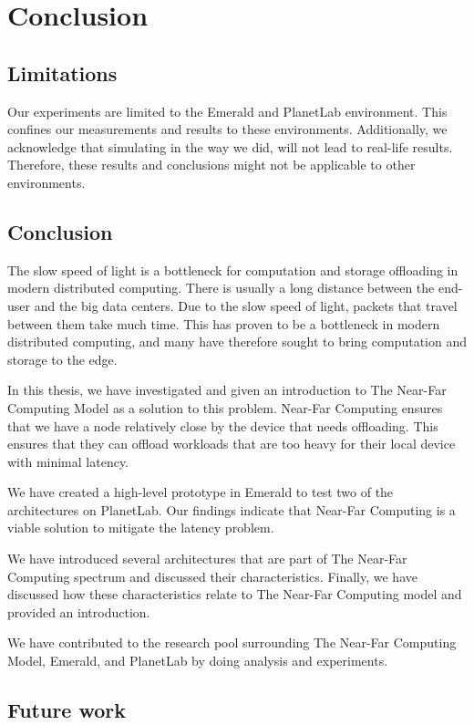 \chapter{Conclusion}

\section{Limitations}
Our experiments are limited to the Emerald and PlanetLab environment. This confines our measurements and results to these environments. Additionally, we acknowledge that simulating in the way we did, will not lead to real-life results. Therefore, these results and conclusions might not be applicable to other environments.


\section{Conclusion}
The slow speed of light is a bottleneck for computation and storage offloading in modern distributed computing. There is usually a long distance between the end-user and the big data centers. Due to the slow speed of light, packets that travel between them take much time. This has proven to be a bottleneck in modern distributed computing, and many have therefore sought to bring computation and storage to the edge. 

In this thesis, we have investigated and given an introduction to The Near-Far Computing Model as a solution to this problem. Near-Far Computing ensures that we have a node relatively close by the device that needs offloading. This ensures that they can offload workloads that are too heavy for their local device with minimal latency. 

We have created a high-level prototype in Emerald to test two of the architectures on PlanetLab. Our findings indicate that Near-Far Computing is a viable solution to mitigate the latency problem. 

We have introduced several architectures that are part of The Near-Far Computing spectrum and discussed their characteristics. Finally, we have discussed how these characteristics relate to The Near-Far Computing model and provided an introduction.

We have contributed to the research pool surrounding The Near-Far Computing Model, Emerald, and PlanetLab by doing analysis and experiments.



\section{Future work}
